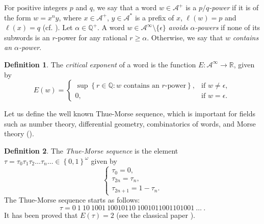 \documentclass[12pt]{article}
\theoremstyle{plain}\newtheorem{teo}{Theorem}
\theoremstyle{plain}\newtheorem{proposition}[teo]{Proposition}
\theoremstyle{plain}\newtheorem{lemma}[teo]{Lemma}
\theoremstyle{plain}\newtheorem{corollary}[teo]{Corollary}
\theoremstyle{plain}\newtheorem{conjecture}[teo]{Conjecture}
\theoremstyle{definition}\newtheorem{definition}[teo]{Definition}
\theoremstyle{remark}\newtheorem{remark}[teo]{Remark}
\theoremstyle{definition}\newtheorem{example}[teo]{Example}
\numberwithin{teo}{section}
\numberwithin{equation}{section}
\begin{document}
\bigskip
For positive integers $p$ and $q$,
we say that a word $w \in \mathcal{A}^+$ is a \textit{$p/q$-power} 
if it is of the form
$w = x^n y$, where $x \in \mathcal{A}^+$, $y\in\mathcal{A}^*$ is a prefix of $x$, $\ell(w) = p$ and $\ell(x) = q$ (cf. \cite{Dejean1972}).
Let $\alpha \in \mathbb{Q}^+$.
A word
$w\in \mathcal{A}^\infty\setminus\{\epsilon\}$
\emph{avoids $\alpha$-powers}
if none of its subwords is an $r$-power
for any rational $r\ge \alpha$.
Otherwise, we say that $w$ \textit{contains an $\alpha$-power}.
\begin{definition}
	\label{def:crit-exp}
	The \textit{critical exponent} of a word 
	is the function $E \colon \mathcal{A}^\infty \to \mathbb{R}$, given by 
	\begin{equation*}
		E(w) =
		\begin{cases}
			\sup\left\{r \in \mathbb{Q}:
				w \text{ contains an $r$-power}	 
			\right\}, & \mbox{if } w \ne \epsilon,\\
			0, &		\mbox{if } w = \epsilon. 
		\end{cases}
	\end{equation*}
\end{definition}


Let us define the well known Thue-Morse sequence, which is important for fields such as number theory, differential geometry,  combinatorics of words,  and Morse theory (\cite{allouche1999ubiquitous}). 

\begin{definition}
	\label{def:ThueMorse}
	The \textit{Thue-Morse sequence} is the element
	$\tau = \tau_0 \tau_1 \tau_2 \dots \tau_n
	\ldots \in \left\{0,1\right\}^\omega$
	given by 
	\[
		\begin{cases}
			\tau_0 = 0, \\
			\tau_{2n} = \tau_n, \\
			\tau_{2n +1 } = 1 - \tau_n.
		\end{cases}
	\]
	The Thue-Morse sequence starts as follows:
	\[
		\tau = 0\ 1\ 10\ 1001\ 10010110\
		1001011001101001\ \dots\  .
	\]
	It has been proved that $ E(\tau) = 2$ (see the classical paper  \cite{thue1912}).
\end{definition}
\end{document}
